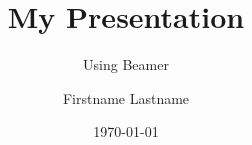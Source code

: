 \documentclass{beamer}
\title{My Presentation}
\subtitle{Using Beamer}
\author{Firstname Lastname}
\institute{University of XYZ}
\date{\today}
\begin{document}
\frame[plain]{\titlepage}
\begin{frame}
\end{frame}
\end{document}
